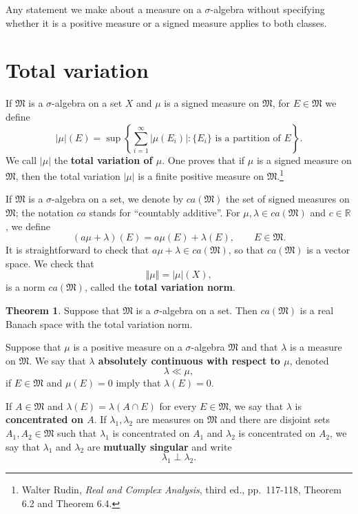 \documentclass{article}
\newcommand{\norm}[1]{\left\Vert #1 \right\Vert}
\theoremstyle{definition}
\newtheorem{theorem}{Theorem}
\theoremstyle{definition}
\begin{document}
Any statement we make about a measure on a $\sigma$-algebra without specifying whether it is a positive measure or a signed
measure applies to both classes.


\section{Total variation}
If $\mathfrak{M}$ is a $\sigma$-algebra on a set $X$ and $\mu$ is a signed measure on $\mathfrak{M}$, for $E \in \mathfrak{M}$ we define
\[
|\mu|(E) = \sup\left\{ \sum_{i=1}^\infty |\mu(E_i)|: \textrm{$\{E_i\}$ is a partition of $E$}\right\}.
\]
We call $|\mu|$ the \textbf{total variation of $\mu$}. One proves that if $\mu$ is a signed measure
on $\mathfrak{M}$, then the total variation $|\mu|$ is a finite positive measure on $\mathfrak{M}$.\footnote{Walter
Rudin, {\em Real and Complex Analysis}, third ed., pp.~117-118, Theorem 6.2 and Theorem 6.4.} 


If $\mathfrak{M}$ is a $\sigma$-algebra on a set, 
we denote by $ca(\mathfrak{M})$ the set of  signed  measures on $\mathfrak{M}$; the notation $ca$ stands for ``countably additive''.
For $\mu,\lambda \in ca(\mathfrak{M})$ and $c \in \mathbb{R}$,  we define
\[
(a\mu + \lambda)(E) = a\mu(E)+\lambda(E), \qquad E \in \mathfrak{M}.
\]
It is straightforward to check that $a\mu+\lambda \in ca(\mathfrak{M})$, so that $ca(\mathfrak{M})$ is a vector space. We check that
\[
\norm{\mu}=|\mu|(X),
\]
is a norm $ca(\mathfrak{M})$, called the  \textbf{total variation norm}.

\begin{theorem}
Suppose that $\mathfrak{M}$ is a $\sigma$-algebra on a set.  Then $ca(\mathfrak{M})$ is a real Banach space with the total variation norm.
\end{theorem}


Suppose that $\mu$ is a positive measure on a $\sigma$-algebra $\mathfrak{M}$ and that $\lambda$ is a measure
on $\mathfrak{M}$. We say that \textbf{$\lambda$ absolutely continuous with respect to $\mu$}, denoted
\[
\lambda \ll \mu,
\]
if $E \in \mathfrak{M}$ and $\mu(E)=0$ imply that $\lambda(E)=0$. 

If $A \in \mathfrak{M}$ and $\lambda(E) = \lambda(A \cap E)$ for every $E \in \mathfrak{M}$, we say that $\lambda$ is \textbf{concentrated
on $A$}. If $\lambda_1,\lambda_2$ are measures on $\mathfrak{M}$ and there are disjoint sets
$A_1,A_2 \in \mathfrak{M}$ such that $\lambda_1$ is concentrated on $A_1$ and $\lambda_2$ is concentrated on $A_2$, we say that
$\lambda_1$ and $\lambda_2$ are \textbf{mutually singular} and write
\[
\lambda_1 \perp \lambda_2.
\]
\end{document}
